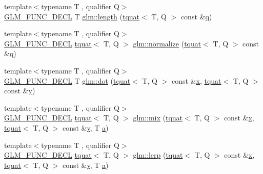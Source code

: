 \begin{DoxyCompactItemize}
\item 
{\footnotesize template$<$typename T , qualifier Q$>$ }\\\mbox{\hyperlink{setup_8hpp_ab2d052de21a70539923e9bcbf6e83a51}{G\+L\+M\+\_\+\+F\+U\+N\+C\+\_\+\+D\+E\+CL}} T \mbox{\hyperlink{group__gtc__quaternion_gab33f82f8d1c9223d335aab752a126855}{glm\+::length}} (\mbox{\hyperlink{structglm_1_1tquat}{tquat}}$<$ T, Q $>$ const \&\mbox{\hyperlink{_s_d_l__opengl_8h_a8fc1e7b9baaae687804c7eed46ca09c6}{q}})
\item 
{\footnotesize template$<$typename T , qualifier Q$>$ }\\\mbox{\hyperlink{setup_8hpp_ab2d052de21a70539923e9bcbf6e83a51}{G\+L\+M\+\_\+\+F\+U\+N\+C\+\_\+\+D\+E\+CL}} \mbox{\hyperlink{structglm_1_1tquat}{tquat}}$<$ T, Q $>$ \mbox{\hyperlink{group__gtc__quaternion_gad4f3769e33c18d1897d1857c1f8da864}{glm\+::normalize}} (\mbox{\hyperlink{structglm_1_1tquat}{tquat}}$<$ T, Q $>$ const \&\mbox{\hyperlink{_s_d_l__opengl_8h_a8fc1e7b9baaae687804c7eed46ca09c6}{q}})
\item 
{\footnotesize template$<$typename T , qualifier Q$>$ }\\\mbox{\hyperlink{setup_8hpp_ab2d052de21a70539923e9bcbf6e83a51}{G\+L\+M\+\_\+\+F\+U\+N\+C\+\_\+\+D\+E\+CL}} T \mbox{\hyperlink{group__gtc__quaternion_gab219911644fdc694e7d275cfcf35bfca}{glm\+::dot}} (\mbox{\hyperlink{structglm_1_1tquat}{tquat}}$<$ T, Q $>$ const \&\mbox{\hyperlink{_s_d_l__opengl_8h_ad0e63d0edcdbd3d79554076bf309fd47}{x}}, \mbox{\hyperlink{structglm_1_1tquat}{tquat}}$<$ T, Q $>$ const \&\mbox{\hyperlink{_s_d_l__opengl_8h_a1675d9d7bb68e1657ff028643b4037e3}{y}})
\item 
{\footnotesize template$<$typename T , qualifier Q$>$ }\\\mbox{\hyperlink{setup_8hpp_ab2d052de21a70539923e9bcbf6e83a51}{G\+L\+M\+\_\+\+F\+U\+N\+C\+\_\+\+D\+E\+CL}} \mbox{\hyperlink{structglm_1_1tquat}{tquat}}$<$ T, Q $>$ \mbox{\hyperlink{group__gtc__quaternion_ga6c31ccbb8548b2b24226901e602dfc0a}{glm\+::mix}} (\mbox{\hyperlink{structglm_1_1tquat}{tquat}}$<$ T, Q $>$ const \&\mbox{\hyperlink{_s_d_l__opengl_8h_ad0e63d0edcdbd3d79554076bf309fd47}{x}}, \mbox{\hyperlink{structglm_1_1tquat}{tquat}}$<$ T, Q $>$ const \&\mbox{\hyperlink{_s_d_l__opengl_8h_a1675d9d7bb68e1657ff028643b4037e3}{y}}, T \mbox{\hyperlink{_s_d_l__opengl__glext_8h_a3309789fc188587d666cda5ece79cf82}{a}})
\item 
{\footnotesize template$<$typename T , qualifier Q$>$ }\\\mbox{\hyperlink{setup_8hpp_ab2d052de21a70539923e9bcbf6e83a51}{G\+L\+M\+\_\+\+F\+U\+N\+C\+\_\+\+D\+E\+CL}} \mbox{\hyperlink{structglm_1_1tquat}{tquat}}$<$ T, Q $>$ \mbox{\hyperlink{group__gtc__quaternion_gabc58e7013ef63d6df69c28c14afd0c01}{glm\+::lerp}} (\mbox{\hyperlink{structglm_1_1tquat}{tquat}}$<$ T, Q $>$ const \&\mbox{\hyperlink{_s_d_l__opengl_8h_ad0e63d0edcdbd3d79554076bf309fd47}{x}}, \mbox{\hyperlink{structglm_1_1tquat}{tquat}}$<$ T, Q $>$ const \&\mbox{\hyperlink{_s_d_l__opengl_8h_a1675d9d7bb68e1657ff028643b4037e3}{y}}, T \mbox{\hyperlink{_s_d_l__opengl__glext_8h_a3309789fc188587d666cda5ece79cf82}{a}})

\end{DoxyCompactItemize}
